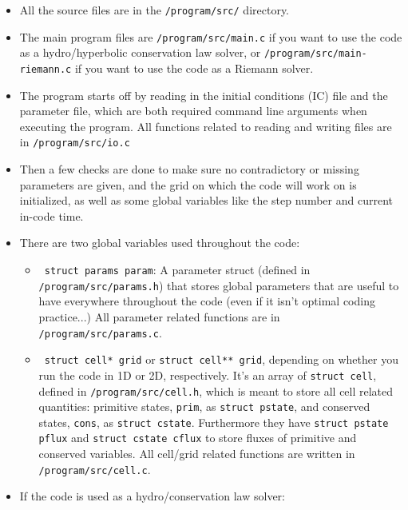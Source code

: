 \begin{itemize}
	\item 	All the source files are in the \verb|/program/src/| directory.
	
	\item 	The main program files are \verb|/program/src/main.c| if you want to use the code as a hydro/hyperbolic conservation law solver, or \verb|/program/src/main-riemann.c| if you want to use the code as a Riemann solver.
	
	\item 	The program starts off by reading in the initial conditions (IC) file and the parameter file, which are both required command line arguments when executing the program.
			All functions related to reading and writing files are in \verb|/program/src/io.c|
	
	\item 	Then a few checks are done to make sure no contradictory or missing parameters are given, and the grid on which the code will work on is initialized, as well as some global variables like the step number and current in-code time.
	
	\item 	There are two global variables used throughout the code:
	
		\begin{itemize}
			\item 	\verb| struct params param|: A parameter struct (defined in \verb|/program/src/params.h|) that stores global parameters that are useful to have everywhere throughout the code (even if it isn't optimal coding practice...)
					All parameter related functions are in \verb|/program/src/params.c|.
			
			\item 	\verb| struct cell* grid| or \verb|struct cell** grid|, depending on whether you run the code in 1D or 2D, respectively.
					It's an array of \verb|struct cell|, defined in \verb|/program/src/cell.h|, which is meant to store all cell related quantities: primitive states, \texttt{prim}, as  \texttt{struct pstate}, and conserved states, \texttt{cons}, as \texttt{struct cstate}.
					Furthermore they have \texttt{struct pstate pflux} and \texttt{struct cstate cflux} to store fluxes of primitive and conserved variables.
					All cell/grid related functions are written in \verb|/program/src/cell.c|.	
		\end{itemize}
	
	\item 	If the code is used as a hydro/conservation law solver: 
	

\end{itemize}
